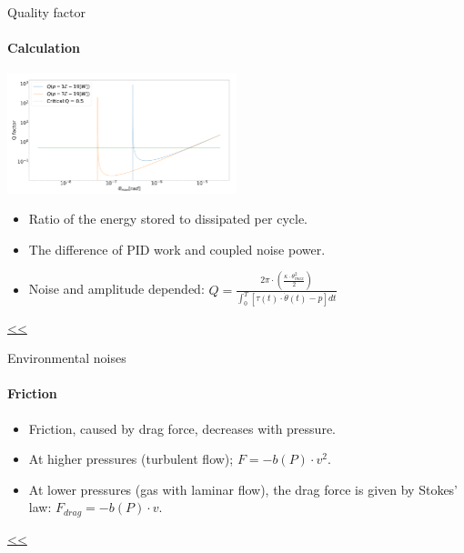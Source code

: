 \documentclass{beamer}
\begin{document}
\begin{frame}{\hypertarget{frame:Quality factor 1}{Quality factor}}
	\framesubtitle{Calculation}
	\begin{center}		
		\includegraphics[width=0.5\textwidth,keepaspectratio]{Q factor.png}
	\end{center}
	\begin{itemize}			
		\item Ratio of the energy stored to dissipated per cycle.
		\item The difference of PID work and coupled noise power. 
		\item Noise and amplitude depended: $Q =  \frac{2\pi\cdot(\frac{\kappa\cdot\theta_{max}^2}{2})}{\int_0^T[\tau(t)\cdot\dot{\theta}(t) - p]dt} $
					
	\end{itemize}
	\hyperlink{frame:Quality factor}{<<} 

\end{frame}

\begin{frame}{\hypertarget{frame:Environmental noises 3}{Environmental noises}}
	\framesubtitle{Friction}
	\begin{itemize}
		\item Friction, caused by drag force, decreases with pressure.		
		\item At higher pressures (turbulent flow); $F = -b(P)\cdot v^2 $.
		\item At lower pressures (gas with laminar flow), the drag force is given by Stokes' law: $F_{drag} =  -b(P)\cdot v$.	
		
	\end{itemize}
	\hyperlink{frame:Environmental noises}{<<} 
\end{frame}
\end{document}
